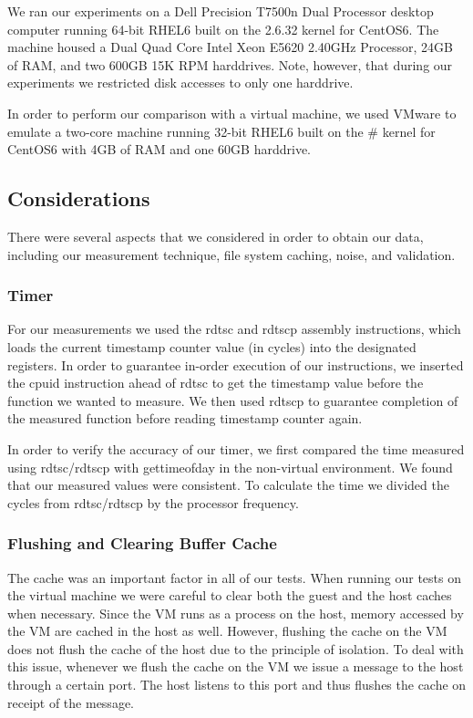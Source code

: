 We ran our experiments on a Dell Precision T7500n Dual Processor desktop 
computer running 64-bit RHEL6 built on the 2.6.32 kernel for CentOS6. The 
machine housed a Dual Quad Core Intel\textsuperscript{\textregistered} 
Xeon\textsuperscript{\textregistered} E5620 2.40GHz Processor, 24GB of RAM, 
and two 600GB 15K RPM harddrives. Note, however, that during our experiments 
we restricted disk accesses to only one harddrive.

In order to perform our comparison with a virtual machine, we used VMware to
emulate a two-core machine running 32-bit RHEL6 built on the \# kernel for CentOS6 
with 4GB of RAM and one 60GB harddrive.

\subsection{Considerations}
There were several aspects that we considered in order to obtain our data, 
including our measurement technique, file system caching, noise, and validation.

\subsubsection{Timer}
For our measurements we used the rdtsc and rdtscp assembly instructions, which loads the current timestamp counter value (in cycles) into the designated registers. In order to guarantee in-order execution of our instructions, we inserted the cpuid instruction ahead of rdtsc to get the timestamp value before the function we wanted to measure. We then used rdtscp to guarantee completion of the measured function before reading timestamp counter again.

In order to verify the accuracy of our timer, we first compared the time measured 
using rdtsc/rdtscp with gettimeofday in the non-virtual environment. We found that 
our measured values were consistent. To calculate the time we divided the cycles from rdtsc/rdtscp by the processor frequency.

\subsubsection{Flushing and Clearing Buffer Cache}
The cache was an important factor in all of our tests. When running our tests on the
virtual machine we were careful to clear both the guest and the host caches when 
necessary. Since the VM runs as a process on the host, memory accessed by the VM
are cached in the host as well. However, flushing the cache on the VM does not 
flush the cache of the host due to the principle of isolation. To deal with this 
issue, whenever we flush the cache on the VM we issue a message to the host through
a certain port. The host listens to this port and thus flushes the cache on receipt
of the message.

